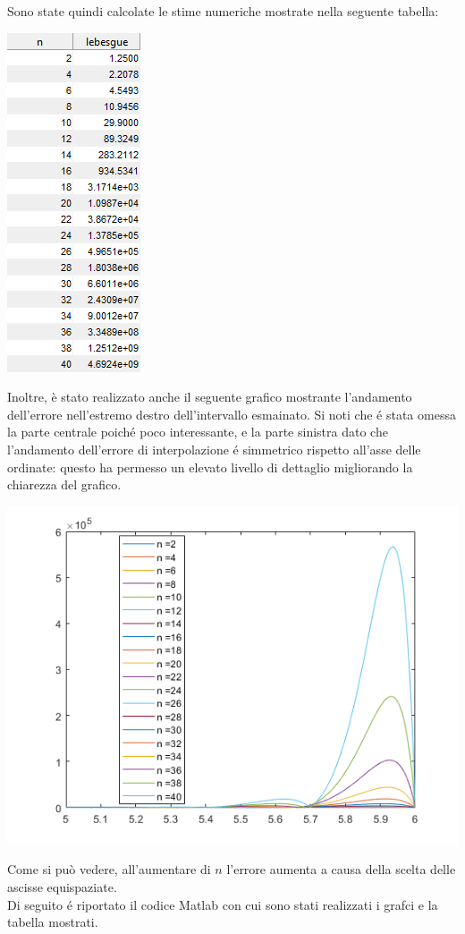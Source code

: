 \newpage

\noindent Sono state quindi calcolate le stime numeriche mostrate nella seguente tabella:

\begin{center}
	\includegraphics[scale=0.7]{cap4/4_9/4_9.png}
\end{center}

\noindent Inoltre, è stato realizzato anche il seguente grafico mostrante l'andamento dell'errore nell'estremo destro dell'intervallo esmainato. Si noti che \'e stata omessa la parte centrale poich\'e poco interessante, e la parte sinistra dato che l'andamento dell'errore di interpolazione \'e simmetrico rispetto all'asse delle ordinate: questo ha permesso un elevato livello di dettaglio migliorando la chiarezza del grafico.

\begin{center}
	\includegraphics[scale=0.7]{cap4/4_9/4_9_error_plot.png}
\end{center}

\noindent Come si può vedere, all'aumentare di $n$ l'errore aumenta a causa della scelta delle ascisse equispaziate. \\

\noindent Di seguito \'e riportato il codice Matlab con cui sono stati realizzati i grafci e la tabella mostrati. \\

\newpage


